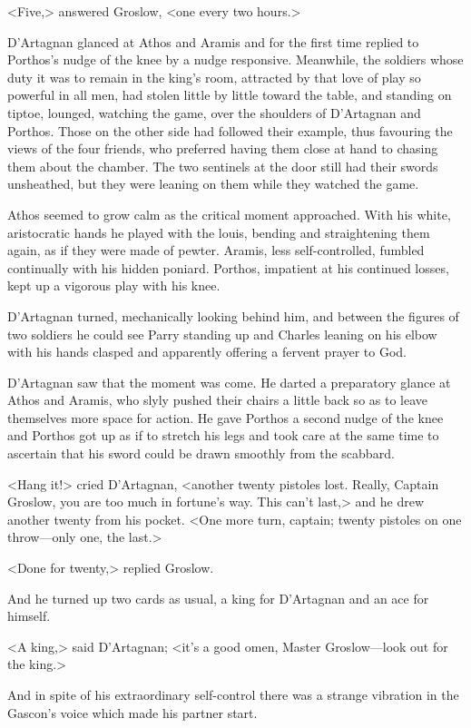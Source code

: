 <Five,> answered Groslow, <one every two hours.>

D'Artagnan glanced at Athos and Aramis and for the first time replied to Porthos's nudge of the knee by a nudge responsive. Meanwhile, the soldiers whose duty it was to remain in the king's room, attracted by that love of play so powerful in all men, had stolen little by little toward the table, and standing on tiptoe, lounged, watching the game, over the shoulders of D'Artagnan and Porthos. Those on the other side had followed their example, thus favouring the views of the four friends, who preferred having them close at hand to chasing them about the chamber. The two sentinels at the door still had their swords unsheathed, but they were leaning on them while they watched the game.

Athos seemed to grow calm as the critical moment approached. With his white, aristocratic hands he played with the louis, bending and straightening them again, as if they were made of pewter. Aramis, less self-controlled, fumbled continually with his hidden poniard. Porthos, impatient at his continued losses, kept up a vigorous play with his knee.

D'Artagnan turned, mechanically looking behind him, and between the figures of two soldiers he could see Parry standing up and Charles leaning on his elbow with his hands clasped and apparently offering a fervent prayer to God.

D'Artagnan saw that the moment was come. He darted a preparatory glance at Athos and Aramis, who slyly pushed their chairs a little back so as to leave themselves more space for action. He gave Porthos a second nudge of the knee and Porthos got up as if to stretch his legs and took care at the same time to ascertain that his sword could be drawn smoothly from the scabbard.

<Hang it!> cried D'Artagnan, <another twenty pistoles lost. Really, Captain Groslow, you are too much in fortune's way. This can't last,> and he drew another twenty from his pocket. <One more turn, captain; twenty pistoles on one throw—only one, the last.>

<Done for twenty,> replied Groslow.

And he turned up two cards as usual, a king for D'Artagnan and an ace for himself.

<A king,> said D'Artagnan; <it's a good omen, Master Groslow—look out for the king.>

And in spite of his extraordinary self-control there was a strange vibration in the Gascon's voice which made his partner start.

